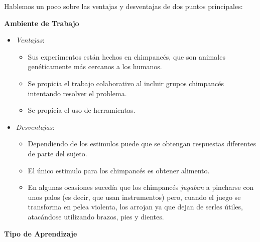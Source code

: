 \documentclass[12pt]{article}
\theoremstyle{largebreak}
\begin{document}
    Hablemos un poco sobre las ventajas y desventajas de dos puntos principales:

    \textbf{Ambiente de Trabajo}
    
    \begin{itemize}
        \item \textit{Ventajas}:
        \begin{itemize}
            \item Sus experimentos están hechos en chimpancés, que son animales genéticamente más cercanos a los humanos.
            \item Se propicia el trabajo colaborativo al incluir grupos chimpancés intentando resolver el problema.
            \item Se propicia el uso de herramientas.
        \end{itemize}
        \item \textit{Desventajas}:
        \begin{itemize}
            \item Dependiendo de los estimulos puede que se obtengan respuestas diferentes de parte del sujeto.
            \item El único estimulo para los chimpancés es obtener alimento.
            \item En algunas ocasiones sucedía que los chimpancés \textit{jugaban} a pincharse con unos palos (es decir, que usan instrumentos) pero, cuando el juego se transforma en pelea violenta, los arrojan ya que dejan de serles útiles, atacándose utilizando brazos, pies y dientes. 
        \end{itemize}
    \end{itemize}

    \textbf{Tipo de Aprendizaje}
    
\end{document}
